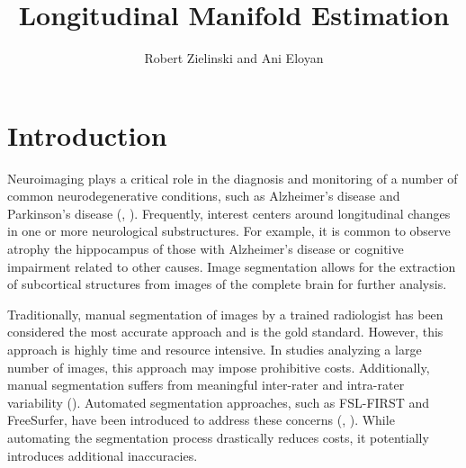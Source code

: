 \documentclass[11pt,reqno]{article}
\begin{document}
\title{Longitudinal Manifold Estimation}
\author[1]{Robert Zielinski and Ani Eloyan}


\maketitle

\doublespacing


\section{Introduction}

Neuroimaging plays a critical role in the diagnosis and monitoring of a number of common neurodegenerative conditions, such as Alzheimer's disease and Parkinson's disease (\cite{knopmanAlzheimerDisease2021}, \cite{poeweParkinsonDisease2017}). Frequently, interest centers around longitudinal changes in one or more neurological substructures. For example, it is common to observe atrophy the hippocampus of those with Alzheimer's disease or cognitive impairment related to other causes. Image segmentation allows for the extraction of subcortical structures from images of the complete brain for further analysis.

Traditionally, manual segmentation of images by a trained radiologist has been considered the most accurate approach and is the gold standard. However, this approach is highly time and resource intensive. In studies analyzing a large number of images, this approach may impose prohibitive costs. Additionally, manual segmentation suffers from meaningful inter-rater and intra-rater variability (\cite{boccardiSurveyProtocolsManual2011}). Automated segmentation approaches, such as FSL-FIRST and FreeSurfer, have been introduced to address these concerns (\cite{patenaudeBayesianModelShape2011}, \cite{reuterWithinsubjectTemplateEstimation2012}). While automating the segmentation process drastically reduces costs, it potentially introduces additional inaccuracies.
\end{document}

